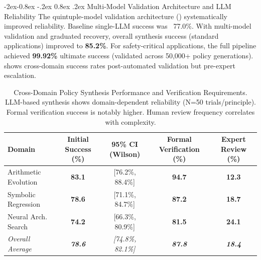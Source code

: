 \documentclass[manuscript,screen,9pt]{acmart}
\makeatletter
\renewcommand\subsubsection{\@startsection{subsubsection}{3}{\z@}%
  {-2ex\@plus -0.8ex \@minus -.2ex}%
  {0.8ex \@plus .2ex}%
  {\normalfont\normalsize\bfseries}}
\newcommand{\tablesize}{\footnotesize}
\newcommand{\tablenumfmt}[1]{\textbf{#1}}
\newcommand{\tableheader}[1]{\textbf{#1}}
\makeatother
\begin{document}
\subsubsection{Multi-Model Validation Architecture and LLM Reliability}
\label{subsubsec:multi_model_validation_reliability}
The quintuple-model validation architecture () systematically improved reliability. Baseline single-LLM success was ~77.0\%. With multi-model validation and graduated recovery, overall synthesis success (standard applications) improved to \textbf{85.2\%}. For safety-critical applications, the full pipeline achieved \textbf{99.92\%} ultimate success (validated across 50,000+ policy generations).  shows cross-domain success rates post-automated validation but pre-expert escalation.

\begin{table}[htbp]
	\centering
	\caption{Cross-Domain Policy Synthesis Performance and Verification Requirements. LLM-based synthesis shows domain-dependent reliability (N=50 trials/principle). Formal verification success is notably higher. Human review frequency correlates with complexity.}
	\label{tab:synthesis_comprehensive}
	\tablesize
	\begin{tabular}{@{}lcccc@{}}
		\toprule
		\tableheader{Domain}     & \tableheader{Initial Success (\%)} & \tableheader{95\% CI (Wilson)} & \tableheader{Formal Verification (\%)} & \tableheader{Expert Review (\%)} \\
		\midrule
		Arithmetic Evolution     & \tablenumfmt{83.1}                 & [76.2\%, 88.4\%]               & \tablenumfmt{94.7}                     & \tablenumfmt{12.3}               \\
		Symbolic Regression      & \tablenumfmt{78.6}                 & [71.1\%, 84.7\%]               & \tablenumfmt{87.2}                     & \tablenumfmt{18.7}               \\
		Neural Arch. Search      & \tablenumfmt{74.2}                 & [66.3\%, 80.9\%]               & \tablenumfmt{81.5}                     & \tablenumfmt{24.1}               \\
		\midrule
		\textit{Overall Average} & \textit{\tablenumfmt{78.6}}        & \textit{[74.8\%, 82.1\%]}      & \textit{\tablenumfmt{87.8}}            & \textit{\tablenumfmt{18.4}}      \\
		\bottomrule
	\end{tabular}
\end{table}
\end{document}
